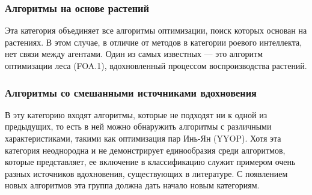 \subsubsection{Алгоритмы на основе растений}

Эта категория объединяет все алгоритмы оптимизации, поиск которых
основан на растениях. В этом случае, в отличие от методов в категории
роевого интеллекта, нет связи между агентами. Один из самых известных — это
алгоритм оптимизации леса (FOA.1), вдохновленный процессом
воспроизводства растений.

\subsubsection{Алгоритмы со смешанными источниками вдохновения}

В эту категорию входят алгоритмы, которые не подходят ни к одной из
предыдущих, то есть в ней можно обнаружить алгоритмы с различными
характеристиками, такими как оптимизация пар Инь-Ян (YYOP).
Хотя эта категория неоднородна и не демонстрирует
единообразия среди алгоритмов, которые представляет, ее включение
в классификацию служит примером очень разных источников вдохновения,
существующих в литературе. С появлением новых алгоритмов эта группа
должна дать начало новым категориям.

